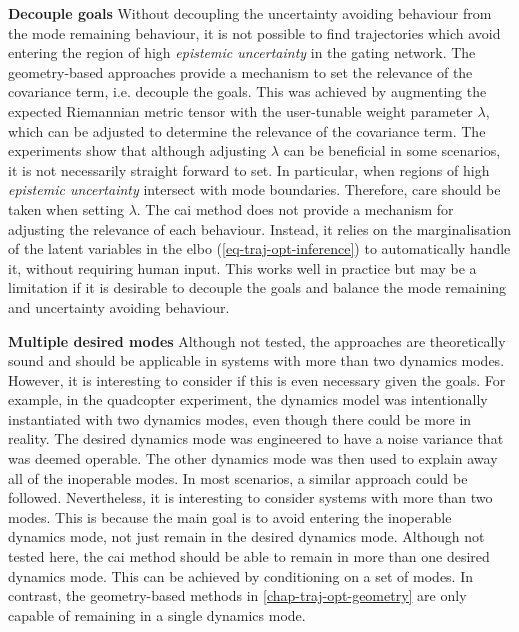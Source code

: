 \documentclass{mimosis-class/mimosis}
\numberwithin{equation}{chapter}
\begin{document}
{\textbf{Decouple goals}
Without decoupling the uncertainty avoiding behaviour from the mode remaining behaviour,
it is not possible to find trajectories which avoid entering the region of high \emph{epistemic uncertainty} in the
gating network.
The geometry-based approaches provide a mechanism to set the relevance of the covariance term, i.e. decouple the goals.
This was achieved by augmenting the expected Riemannian metric tensor with the user-tunable weight
parameter \(\lambda\), which can be adjusted to determine the relevance of the covariance term.
The experiments show that although adjusting \(\lambda\) can be beneficial in some scenarios, it is not necessarily straight
forward to set.
In particular, when regions of high \emph{epistemic uncertainty} intersect with mode boundaries.
Therefore, care should be taken when setting \(\lambda\).
The \acrshort{cai} method does not provide a mechanism for adjusting the relevance of each behaviour.
Instead, it relies on the marginalisation of the latent variables in the \acrshort{elbo}
(\cref{eq-traj-opt-inference}) to automatically handle it, without requiring human input.
This works well in practice but may be a limitation if it is desirable to decouple the goals and
balance the mode remaining and uncertainty avoiding behaviour.


\textbf{Multiple desired modes}
Although not tested, the approaches are theoretically sound and should be applicable in systems with more
than two dynamics modes.
However, it is interesting to consider if this is even necessary given the goals.
For example, in the quadcopter experiment, the dynamics model was intentionally instantiated
with two dynamics modes, even though there could be more in reality.
The desired dynamics mode was engineered to have a noise variance that was deemed operable.
The other dynamics mode was then used to explain away all of the inoperable modes.
In most scenarios, a similar approach could be followed.
Nevertheless, it is interesting to consider systems with more than two modes.
This is because the main goal is to avoid entering the inoperable dynamics mode, not just remain in the desired
dynamics mode.
Although not tested here, the \acrshort{cai} method should be able to remain
in more than one desired dynamics mode.
This can be achieved by conditioning on a set of modes.
In contrast, the geometry-based methods in \cref{chap-traj-opt-geometry} are only capable of remaining in a single
dynamics mode.

}
\end{document}
